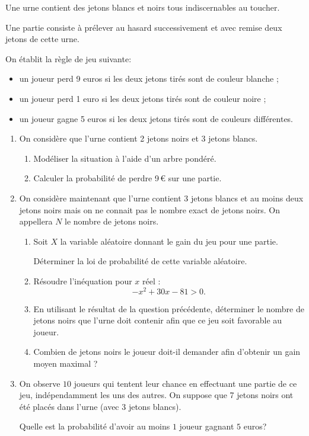 Une urne contient des jetons blancs et noirs tous indiscernables au toucher.

Une partie consiste à prélever au hasard successivement et avec remise deux jetons de cette urne.

On établit la règle de jeu suivante:

\begin{itemize}
	\item un joueur perd 9 euros si les deux jetons tirés sont de couleur blanche ;
	\item un joueur perd 1 euro si les deux jetons tirés sont de couleur noire ;
	\item un joueur gagne 5 euros si les deux jetons tirés sont de couleurs différentes.
\end{itemize}

\begin{enumerate}
	\item On considère que l'urne contient 2 jetons noirs et 3 jetons blancs.
	\begin{enumerate}
		\item Modéliser la situation à l'aide d'un arbre pondéré.
		\item Calculer la probabilité de perdre 9\,€ sur une partie.
	\end{enumerate}	
	\item On considère maintenant que l'urne contient 3 jetons blancs et au moins deux jetons noirs mais on ne connait pas le nombre exact de jetons noirs. On appellera $N$ le nombre de jetons noirs.
	\begin{enumerate}
		\item Soit $X$ la variable aléatoire donnant le gain du jeu pour une partie.
		
		Déterminer la loi de probabilité de cette variable aléatoire.
		\item Résoudre l'inéquation pour $x$ réel : \[-x^2  + 30x - 81 > 0.\]
		\item En utilisant le résultat de la question précédente, déterminer le nombre de jetons noirs que l'urne doit contenir afin que ce jeu soit favorable au joueur.
		\item Combien de jetons noirs le joueur doit-il demander afin d'obtenir un gain moyen maximal ?
	\end{enumerate}
	\item On observe $10$ joueurs qui tentent leur chance en effectuant une partie de ce jeu, indépendamment les uns des autres. On suppose que 7 jetons noirs ont été placés dans l'urne (avec 3 jetons blancs).
	
	Quelle est la probabilité d'avoir au moins $1$ joueur gagnant $5$ euros?
\end{enumerate}
